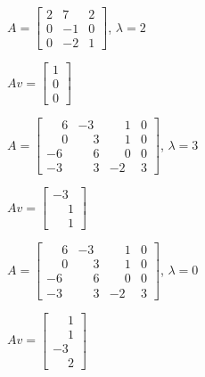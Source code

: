 \documentclass[12pt]{exam}
\begin{document}
\begin{exercicio}
    $A = \begin{bmatrix}2 & 7 & 2\\0 & -1 & 0\\0 & -2 & 1\end{bmatrix}$, $\lambda = 2$
    \begin{solucao}
        $Av = \begin{bmatrix}1\\0\\0\end{bmatrix}$
    \end{solucao}
\end{exercicio}

\begin{exercicio}
    $A = \begin{bmatrix}\phantom{-}6 & -3 & \phantom{-}1 & 0\\\phantom{-}0 & \phantom{-}3 & \phantom{-}1 & 0\\-6 & \phantom{-}6 & \phantom{-}0 & 0\\-3 & \phantom{-}3 & -2 & 3\end{bmatrix}$, $\lambda = 3$
    \begin{solucao}
        $Av = \begin{bmatrix}-3\\\phantom{-}1\\\phantom{-}1\end{bmatrix}$
    \end{solucao}
\end{exercicio}

\begin{exercicio}\label{fimautovalor}
    $A = \begin{bmatrix}\phantom{-}6 & -3 & \phantom{-}1 & 0\\\phantom{-}0 & \phantom{-}3 & \phantom{-}1 & 0\\-6 & \phantom{-}6 & \phantom{-}0 & 0\\-3 & \phantom{-}3 & -2 & 3\end{bmatrix}$, $\lambda = 0$
    \begin{solucao}
        $Av = \begin{bmatrix}\phantom{-}1\\\phantom{-}1\\-3\\\phantom{-}2\end{bmatrix}$
    \end{solucao}
\end{exercicio}
\end{document}
